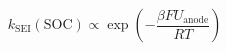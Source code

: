 \documentclass[preview]{standalone}
\begin{document}
\[k_\text{SEI}(\text{SOC}) \propto \exp\!\left(-\frac{\beta F U_\text{anode}}{RT}\right) \tag{7.4}\]
\end{document}
